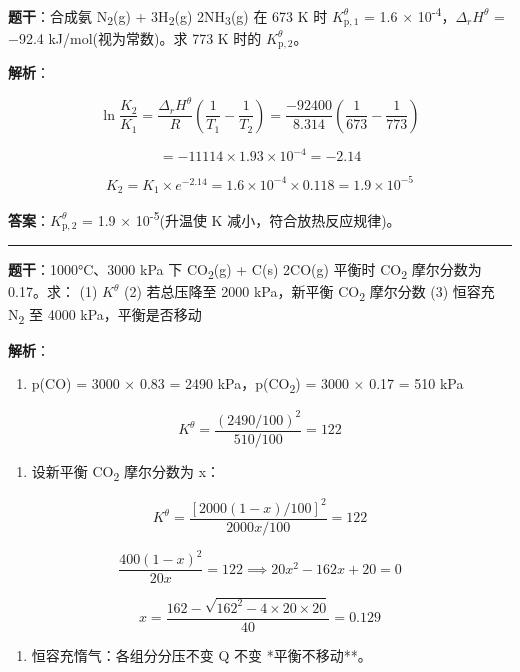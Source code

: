\textbf{题干}：合成氨 N\textsubscript{2}(g) + 3H\textsubscript{2}(g) \衡 2NH\textsubscript{3}(g) 在 673 K 时 \(K_{\mathrm p,1}^\theta\) = 1.6 × 10\textsuperscript{-4}，\(\Delta_r H^\theta\) = −92.4 kJ/mol(视为常数)。求 773 K 时的 \(K_{\mathrm p,2}^\theta\)。

\textbf{解析}：

\[\ln\frac{K_2}{K_1} = \frac{\Delta_r H^\theta}{R}\left(\frac{1}{T_1} - \frac{1}{T_2}\right) = \frac{-92400}{8.314}\left(\frac{1}{673} - \frac{1}{773}\right)\]

\[= -11114 \times 1.93 \times 10^{-4} = -2.14\]

\[K_2 = K_1 \times e^{-2.14} = 1.6 \times 10^{-4} \times 0.118 = 1.9 \times 10^{-5}\]

\textbf{答案}：\(K_{\mathrm p,2}^\theta\) = 1.9 × 10\textsuperscript{-5}(升温使 K 减小，符合放热反应规律)。

\begin{center}\rule{0.5\linewidth}{0.5pt}\end{center}

\textbf{题干}：1000°C、3000 kPa 下 CO\textsubscript{2}(g) + C(s) \衡 2CO(g) 平衡时 CO\textsubscript{2} 摩尔分数为 0.17。求：
(1) \(K^\theta\)
(2) 若总压降至 2000 kPa，新平衡 CO\textsubscript{2} 摩尔分数
(3) 恒容充 N\textsubscript{2} 至 4000 kPa，平衡是否移动

\textbf{解析}：

\begin{enumerate}
\def\labelenumi{(\arabic{enumi})}
\tightlist
\item
  p(CO) = 3000 × 0.83 = 2490 kPa，p(CO\textsubscript{2}) = 3000 × 0.17 = 510 kPa
\end{enumerate}

\[K^\theta = \frac{(2490/100)^2}{510/100} = 122\]

\begin{enumerate}
\def\labelenumi{(\arabic{enumi})}
\setcounter{enumi}{1}
\tightlist
\item
  设新平衡 CO\textsubscript{2} 摩尔分数为 x：
\end{enumerate}

\[K^\theta = \frac{[2000(1-x)/100]^2}{2000x/100} = 122\]

\[\frac{400(1-x)^2}{20x} = 122 \implies 20x^2 - 162x + 20 = 0\]

\[x = \frac{162 - \sqrt{162^2 - 4 \times 20 \times 20}}{40} = 0.129\]

\begin{enumerate}
\def\labelenumi{(\arabic{enumi})}
\setcounter{enumi}{2}
\tightlist
\item
  恒容充惰气：各组分分压不变 \箭 Q 不变 \箭 **平衡不移动**。
\end{enumerate}

